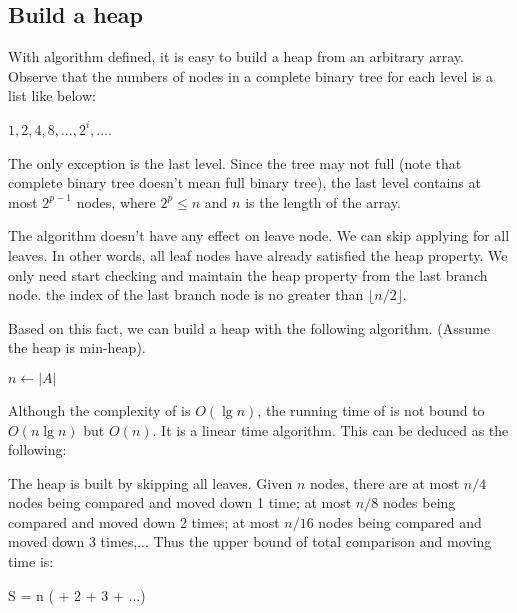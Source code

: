 \documentclass{article}
\begin{document}
\subsection{Build a heap}

With  algorithm defined, it is easy to build a heap from an arbitrary
array. Observe that the numbers of nodes in a complete binary tree
for each level is a list like below:

$1, 2, 4, 8, ..., 2^i, ...$.

The only exception is the last level. Since the tree may not full
(note that complete binary tree doesn't mean full binary tree), the
last level contains at most $2^{p-1}$ nodes, where $2^p \leq n$ and $n$
is the length of the array.

The  algorithm doesn't have any effect on leave node.
We can skip applying  for all leaves. In other words,
all leaf nodes have already satisfied the heap property. We only need
start checking and maintain the heap property from the last branch node.
the index of the last branch node is no greater than $\lfloor n/2 \rfloor$.

Based on this fact, we can build a heap with the following algorithm.
(Assume the heap is min-heap).

\begin{algorithmic}[1]
  \State $n \gets |A|$
    \State {}
  \EndFor
\EndFunction
\end{algorithmic}

Although the complexity of  is $O(\lg n)$, the running time
of  is not bound to $O(n \lg n)$ but $O(n)$. It
is a linear time algorithm. This can be deduced as the following:

The heap is built by skipping all leaves.
Given $n$ nodes, there are at most $n/4$ nodes being compared and moved down 1 time;
at most $n/8$ nodes being compared and moved down 2 times; at most $n/16$ nodes being
compared and moved down 3 times,... Thus the upper bound of total comparison and
moving time is:

\be
S = n ( + 2  + 3  + ...)
\label{eq:build-heap-1}
\ee
\end{document}
